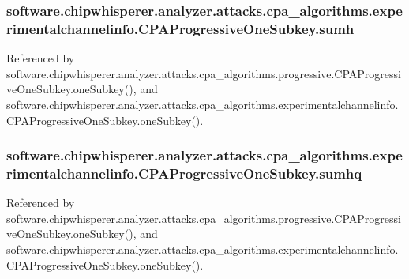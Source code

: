 \subsubsection[{sumh}]{\setlength{\rightskip}{0pt plus 5cm}software.\+chipwhisperer.\+analyzer.\+attacks.\+cpa\+\_\+algorithms.\+experimentalchannelinfo.\+C\+P\+A\+Progressive\+One\+Subkey.\+sumh}\label{classsoftware_1_1chipwhisperer_1_1analyzer_1_1attacks_1_1cpa__algorithms_1_1experimentalchannelinfo_1_1CPAProgressiveOneSubkey_a7b626cdb9f5cf746c43291b1d1f0aa4c}


Referenced by software.\+chipwhisperer.\+analyzer.\+attacks.\+cpa\+\_\+algorithms.\+progressive.\+C\+P\+A\+Progressive\+One\+Subkey.\+one\+Subkey(), and software.\+chipwhisperer.\+analyzer.\+attacks.\+cpa\+\_\+algorithms.\+experimentalchannelinfo.\+C\+P\+A\+Progressive\+One\+Subkey.\+one\+Subkey().

\hypertarget{classsoftware_1_1chipwhisperer_1_1analyzer_1_1attacks_1_1cpa__algorithms_1_1experimentalchannelinfo_1_1CPAProgressiveOneSubkey_a7f280e8949b251a91fe7637685f256b0}{}
\subsubsection[{sumhq}]{\setlength{\rightskip}{0pt plus 5cm}software.\+chipwhisperer.\+analyzer.\+attacks.\+cpa\+\_\+algorithms.\+experimentalchannelinfo.\+C\+P\+A\+Progressive\+One\+Subkey.\+sumhq}\label{classsoftware_1_1chipwhisperer_1_1analyzer_1_1attacks_1_1cpa__algorithms_1_1experimentalchannelinfo_1_1CPAProgressiveOneSubkey_a7f280e8949b251a91fe7637685f256b0}


Referenced by software.\+chipwhisperer.\+analyzer.\+attacks.\+cpa\+\_\+algorithms.\+progressive.\+C\+P\+A\+Progressive\+One\+Subkey.\+one\+Subkey(), and software.\+chipwhisperer.\+analyzer.\+attacks.\+cpa\+\_\+algorithms.\+experimentalchannelinfo.\+C\+P\+A\+Progressive\+One\+Subkey.\+one\+Subkey().

\hypertarget{classsoftware_1_1chipwhisperer_1_1analyzer_1_1attacks_1_1cpa__algorithms_1_1experimentalchannelinfo_1_1CPAProgressiveOneSubkey_a59f4415f854eac5b02940eb3eccc0d84}{}
